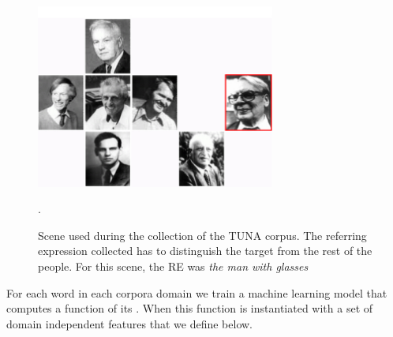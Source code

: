 \begin{figure}[ht]
\centering
\includegraphics[width=0.7\textwidth]{images/tuna-people.jpg}

\caption{Scene used during the collection of the TUNA corpus. The referring expression collected has to distinguish the target from the rest of the people. For this scene, the RE was \emph{the man with glasses}}. 
\label{Tuna-people-scene}
\centering

\end{figure}

For each word in each corpora domain we train a machine learning model that computes a function of its \puse. When this function is instantiated with a set of domain independent features that we define below. 



